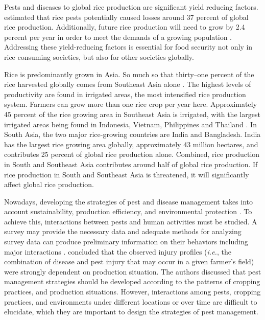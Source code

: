 \thispagestyle{empty}
Pests and diseases to global rice production are significant yield reducing factors. \citet{OERKE:2006ct} estimated that rice pests potentially caused losses around 37 percent of global rice production. Additionally, future rice production will need to grow by 2.4 percent per year in order to meet the demands of a growing population \citep{Ray:2013by}. Addressing these yield-reducing factors is essential for food security not only in rice consuming societies, but also for other societies globally.

Rice is predominantly grown in Asia. So much so that thirty--one percent of the rice harvested globally comes from Southeast Asia alone \citep{oecd2012oecd}. The highest levels of productivity are found in irrigated areas, the most intensified rice production system. Farmers can grow more than one rice crop per year here. Approximately 45 percent of the rice growing area in Southeast Asia is irrigated, with the largest irrigated areas being found in Indonesia, Vietnam, Philippines and Thailand \citep{mutert2002developments}. In South Asia, the two major rice-growing countries are India and Bangladesh. India has the largest rice growing area globally, approximately 43 million hectares, and contributes 25 percent of global rice production alone. Combined, rice production in South and Southeast Asia contributes around half of global rice production. If rice production in South and Southeast Asia is threatened, it will significantly affect global rice production. 


Nowadays, developing the strategies of pest and disease management takes into account sustainability, production efficiency, and environmental protection \citep{Mew:2004kh}. To achieve this, interactions between pests and human activities must be studied. A survey may provide the necessary data and adequate methods for analyzing survey data can produce preliminary information on their behaviors including major interactions \citep{savary1995use}. \citet{Savary:2000vr} concluded that the observed injury profiles (\textit{i.e.}, the combination of disease and pest injury that may occur in a given farmer's field) were strongly dependent on production situation.  The authors discussed that pest management strategies should be developed according to the patterns of cropping practices, and production situations. However, interactions among pests, cropping practices, and environments under different locations or over time are difficult to elucidate, which they are important to design the strategies of pest management.

